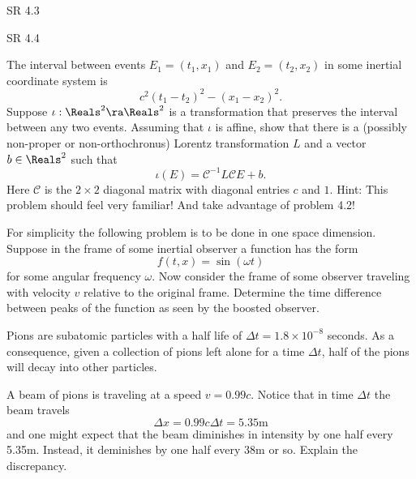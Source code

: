 \documentclass[minion]{homework}
\begin{document}
\begin{aproblems}

\hproblem SR 4.3

\hproblem SR 4.4

\hproblem The interval between events $E_1=(t_1,x_1)$ and $E_2=(t_2,x_2)$ in some inertial coordinate
system is
\begin{equation}
c^2(t_1-t_2)^2 - (x_1-x_2)^2.
\end{equation}
Suppose $\iota:\Reals^2\ra\Reals^2$ is a transformation that preserves the interval between any two
events.  Assuming that $\iota$ is affine, show that there is a (possibly non-proper or non-orthochronus) Lorentz transformation $L$ and a vector $b\in \Reals^2$ such that
\begin{equation}
\iota(E) = {\mathcal C}^{-1} L {\mathcal C} E + b.
\end{equation}
Here $\mathcal C$ is the $2\times 2$ diagonal matrix with diagonal entries $c$ and $1$.
Hint: This problem should feel very familiar! And take advantage of problem 4.2!

\hproblem For simplicity the following problem is to be done in one space dimension.
Suppose in the frame of some inertial observer a function has the form
\begin{equation}
f(t,x) = \sin(\omega t)
\end{equation}
for some angular frequency $\omega$.  Now consider the frame of some observer traveling
with velocity $v$ relative to the original frame.  Determine the time difference between peaks
of the function as seen by the boosted observer.

\hproblem Pions are subatomic particles with a half life of $\Delta t=1.8\times10^{-8}$ seconds.  As a consequence, given a collection of pions left alone for a time $\Delta t$, half
of the pions will decay into other particles.

A beam of pions is traveling at a speed $v=0.99c$. Notice that in time $\Delta t$ the beam
travels
\begin{equation}
\Delta x = 0.99 c \Delta t = 5.35 \mathrm{m}
\end{equation}
and one might expect that the beam diminishes in intensity by one half every 5.35m.  Instead,
it deminishes by one half every 38m or so.  Explain the discrepancy.
\end{aproblems}
\end{document}
